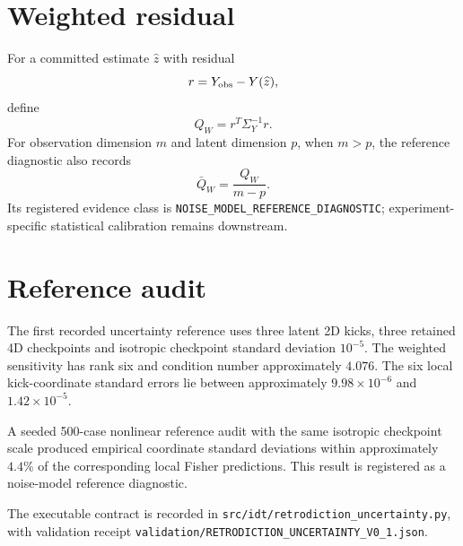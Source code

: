 \section{Weighted residual}

For a committed estimate \(\widehat z\) with residual
\[
r=Y_{\rm obs}-Y(\widehat z),
\]
define
\[
\boxed{
Q_W=r^T\Sigma_Y^{-1}r.
}
\]
For observation dimension \(m\) and latent dimension \(p\), when \(m>p\), the reference diagnostic also records
\[
\boxed{
\bar Q_W=\frac{Q_W}{m-p}.
}
\]
Its registered evidence class is \texttt{NOISE\_MODEL\_REFERENCE\_DIAGNOSTIC}; experiment-specific statistical calibration remains downstream.

\section{Reference audit}

The first recorded uncertainty reference uses three latent 2D kicks, three retained 4D checkpoints and isotropic checkpoint standard deviation \(10^{-5}\). The weighted sensitivity has rank six and condition number approximately \(4.076\). The six local kick-coordinate standard errors lie between approximately \(9.98\times10^{-6}\) and \(1.42\times10^{-5}\).

A seeded 500-case nonlinear reference audit with the same isotropic checkpoint scale produced empirical coordinate standard deviations within approximately \(4.4\%\) of the corresponding local Fisher predictions. This result is registered as a noise-model reference diagnostic.

The executable contract is recorded in \texttt{src/idt/retrodiction\_uncertainty.py}, with validation receipt \texttt{validation/RETRODICTION\_UNCERTAINTY\_V0\_1.json}.
